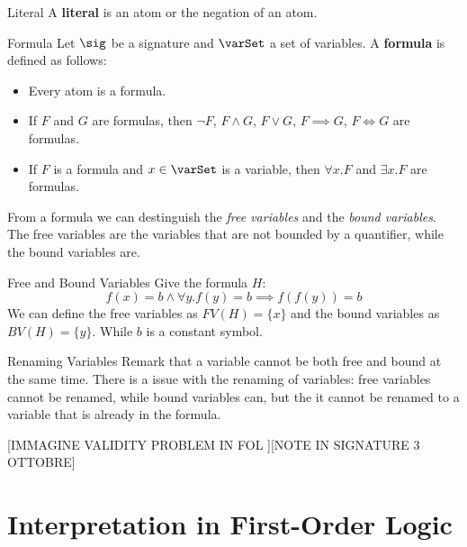 \begin{definition}{Literal}
    A \textbf{literal} is an atom or the negation of an atom.
\end{definition}

\begin{definition}{Formula}
    Let $\sig$ be a signature and $\varSet$ a set of variables.
    A \textbf{formula} is defined as follows:
    \begin{itemize}
        \item Every atom is a formula.
        \item If $F$ and $G$ are formulas, then 
        $\neg F$, $F \land G$, $F \lor G$, $F \implies G$, $F \iff G$ are formulas.
        \item If $F$ is a formula and $x \in \varSet$ is a variable, 
        then $\forall x.F$ and $\exists x.F$ are formulas.
    \end{itemize}
\end{definition}

From a formula we can destinguish the \textit{free variables} and the \textit{bound variables}.
The free variables are the variables that are not bounded by a quantifier,
while the bound variables are.

\begin{example}{Free and Bound Variables}
    Give the formula $H$:
    \begin{equation*}
        f(x) = b \land \forall y. f(y) = b
        \implies f(f(y)) = b
    \end{equation*}
    We can define the free variables as $FV(H) = \{x\}$ and the bound variables as 
    $BV(H) = \{y\}$. While $b$ is a constant symbol.
\end{example}

\begin{remark}{Renaming Variables}
    Remark that a variable cannot be both free and bound at the same time.
    There is a issue with the renaming of variables:
    free variables cannot be renamed, while bound variables can, 
    but the it cannot be renamed to a variable that is already in the formula.
\end{remark}

[IMMAGINE VALIDITY PROBLEM IN FOL ][NOTE IN SIGNATURE 3 OTTOBRE]

\section{Interpretation in First-Order Logic}

